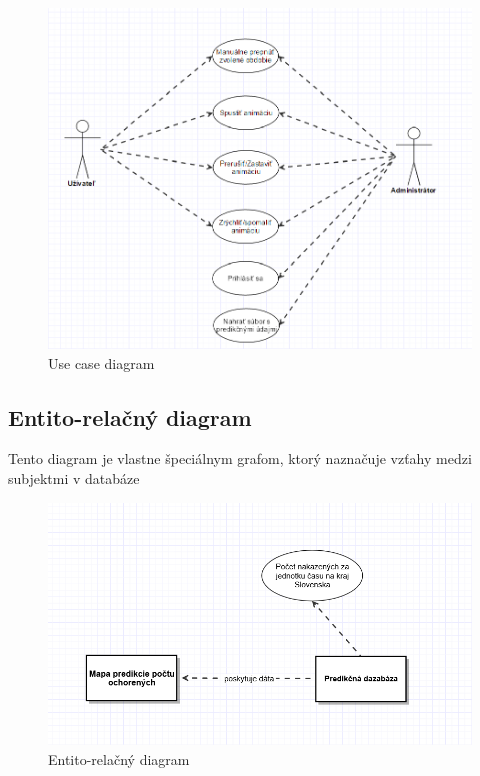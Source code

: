 \documentclass[12pt,a4paper]{report}
\begin{document}
\begin{figure}[htb]
	\centering
	\includegraphics[scale=0.6]{use_case_diagram}
	\caption{Use case diagram}
	\label{fig:Use case diagram}
\end{figure}


\FloatBarrier
\clearpage
\subsection[Entito-relačný diagram]{\rmfamily\bfseries
	Entito-relačný diagram}
Tento diagram je vlastne špeciálnym grafom, ktorý naznačuje vzťahy medzi subjektmi v databáze

\begin{figure}[htb]
	\centering
	\includegraphics[scale=0.7]{E-R_diagram}
	\caption{Entito-relačný diagram}
	\label{fig:Entito-relačný diagram}
\end{figure}
\end{document}
